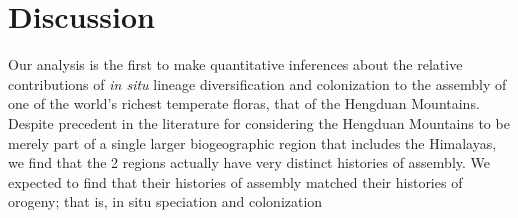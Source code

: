 \section{Discussion}

Our analysis is the first to make quantitative inferences about the relative contributions of \textit{in situ} lineage diversification and colonization to the assembly of one of the world's richest temperate floras, that of the Hengduan Mountains. Despite precedent in the literature for considering the Hengduan Mountains to be merely part of a single larger biogeographic region that includes the Himalayas, we find that the 2 regions actually have very distinct histories of assembly. We expected to find that their histories of assembly matched their histories of orogeny; that is, in situ speciation and colonization